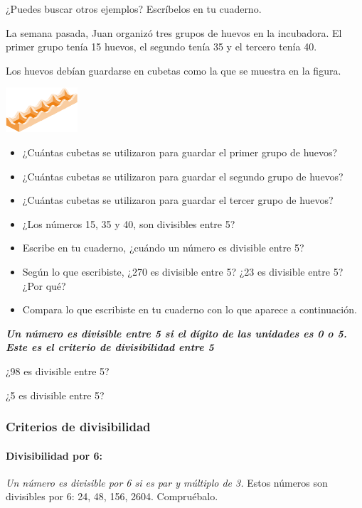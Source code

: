 \documentclass[10pt,twoside]{article}
\begin{document}
¿Puedes buscar otros ejemplos? Escríbelos en tu cuaderno.\\
\begin{minipage}{.7\textwidth}
La semana pasada, Juan organizó tres grupos de huevos en la incubadora. El primer grupo tenía 15 huevos, el segundo tenía 35 y el tercero tenía 40.

Los huevos debían guardarse en cubetas como la que se muestra en la figura.
\end{minipage}
\begin{minipage}{.25\textwidth}
 \begin{center}
 \includegraphics{./Images/minicubeta.png}
\end{center}
\end{minipage}
\begin{itemize}
 \item  ¿Cuántas cubetas se utilizaron para guardar el primer
grupo de huevos?
\item ¿Cuántas cubetas se utilizaron para guardar el segundo
grupo de huevos?
\item ¿Cuántas cubetas se utilizaron para guardar el tercer
grupo de huevos?
\item ¿Los números 15, 35 y 40, son divisibles entre 5?
\item Escribe en tu cuaderno, ¿cuándo un número es divisible
entre 5?
\item Según lo que escribiste, ¿270 es divisible entre 5? ¿23 es
divisible entre 5? ¿Por qué?
\item Compara lo que escribiste en tu cuaderno con lo que
aparece a continuación.
\end{itemize}
\emph{\textbf{Un número es divisible entre 5 si el dígito de las unidades es 0 o 5. Este es el criterio de divisibilidad entre 5}}
\begin{itemize}
\begin{multicols}{2}
 \item ¿98 es divisible entre 5?
 \item ¿5 es divisible entre 5?
 \end{multicols}
\end{itemize}
\subsubsection*{Criterios de divisibilidad}
\paragraph*{Divisibilidad por 6:} \emph{Un número es divisible por 6 si es par y múltiplo de 3.}
Estos números son divisibles por 6: 24, 48, 156, 2604. Compruébalo.
\end{document}
